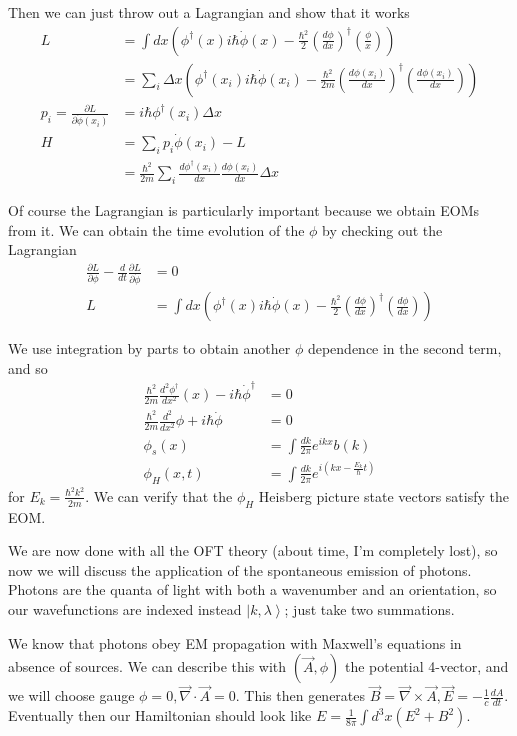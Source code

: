 \documentclass[10pt]{report}
\newcommand{\ket}[1]{\left|#1\right>}
\newcommand{\rd}[2]{\frac{d#1}{d#2}}
\newcommand{\pd}[2]{\frac{\partial #1}{\partial#2}}
\newcommand{\rtd}[2]{\frac{d^2#1}{d#2^2}}
\newcommand{\curl}[0]{\vec{\nabla}\times}
\renewcommand{\div}[0]{\vec{\nabla}\cdot}
\begin{document}
Then we can just throw out a Lagrangian and show that it works
\begin{align}
    L &= \int dx \left( \phi^\dagger(x) i\hbar \dot{\phi}(x) - \frac{\hbar^2}{2}\left( \rd{\phi}{x} \right)^\dagger\left( \frac{\phi}{x} \right) \right)\\
    &= \sum_{i}^{}\Delta x \left( \phi^\dagger(x_i) i\hbar \dot{\phi}(x_i) - \frac{\hbar^2}{2m}\left( \rd{\phi(x_i)}{x} \right)^\dagger\left( \rd{\phi(x_i)}{x} \right) \right)\\
    p_i = \pd{L}{\dot{\phi}(x_i)} &= i\hbar \phi^\dagger(x_i)\Delta x\\
    H &= \sum_{i}^{}p_i \dot{\phi}(x_i) - L\\
    &= \frac{\hbar^2}{2m}\sum_{i}^{} \rd{\phi^\dagger(x_i)}{x}\rd{\phi(x_i)}{x}\Delta x
\end{align}

Of course the Lagrangian is particularly important because we obtain EOMs from it. We can obtain the time evolution of the $\phi$ by checking out the Lagrangian
\begin{align}
    \pd{L}{\phi} - \rd{}{t}\pd{L}{\dot{\phi}} &= 0\\
    L &= \int dx \left( \phi^\dagger(x) i\hbar \dot{\phi}(x) - \frac{\hbar^2}{2}\left( \rd{\phi}{x} \right)^\dagger\left( \rd{\phi}{x} \right) \right)
\end{align}

We use integration by parts to obtain another $\phi$ dependence in the second term, and so 
\begin{align}
    \frac{\hbar^2}{2m}\rtd{\phi^\dagger}{x}(x) - i\hbar\dot{\phi}^\dagger &= 0\\
    \frac{\hbar^2}{2m}\rtd{}{x}\phi + i\hbar\dot{\phi} &= 0\\
    \phi_s(x) &= \int\frac{dk}{2\pi} e^{ikx}b(k)\\
    \phi_H(x,t) &= \int \frac{dk}{2\pi}e^{i \left( kx - \frac{E_k}{\hbar}t \right)}
\end{align}
for $E_k = \frac{\hbar^2 k^2}{2m}$. We can verify that the $\phi_H$ Heisberg picture state vectors satisfy the EOM.

We are now done with all the OFT theory (about time, I'm completely lost), so now we will discuss the application of the spontaneous emission of photons. Photons are the quanta of light with both a wavenumber and an orientation, so our wavefunctions are indexed instead $\ket{k, \lambda}$; just take two summations.

We know that photons obey EM propagation with Maxwell's equations in absence of sources. We can describe this with $(\vec{A}, \phi)$ the potential 4-vector, and we will choose gauge $\phi = 0, \div \vec{A} = 0$. This then generates $\vec{B} = \curl \vec{A}, \vec{E} = -\frac{1}{c}\rd{A}{t}$. Eventually then our Hamiltonian should look like $E = \frac{1}{8\pi}\int d^3x (E^2 + B^2)$.
\end{document}
